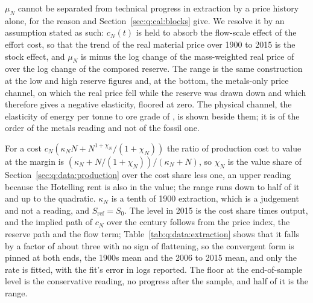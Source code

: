  $\mu_N$ cannot be separated from technical progress in extraction by a price history alone, for the reason  and Section~\ref{sec:q:cal:blocks} give. We resolve it by an assumption stated as such: $c_N\left(t\right)$ is held to absorb the flow-scale effect of the effort cost, so that the trend of the real material price over 1900 to 2015 is the stock effect, and $\mu_N$ is minus the log change of the mass-weighted real price of \textcite{jacks2019} over the log change of the composed reserve. The range is the same construction at the low and high reserve figures and, at the bottom, the metals-only price channel, on which the real price fell while the reserve was drawn down and which therefore gives a negative elasticity, floored at zero. The physical channel, the elasticity of energy per tonne to ore grade of \textcite{mudd2010}, is shown beside them; it is of the order of the metals reading and not of the fossil one.

 For a cost $c_N\left(\kappa_NN+N^{1+\chi_N}/\left(1+\chi_N\right)\right)$ the ratio of production cost to value at the margin is $\left(\kappa_N+N/\left(1+\chi_N\right)\right)/\left(\kappa_N+N\right)$, so $\chi_N$ is the value share of Section~\ref{sec:q:data:production} over the cost share less one, an upper reading because the Hotelling rent is also in the value; the range runs down to half of it and up to the quadratic. $\kappa_N$ is a tenth of 1900 extraction, which is a judgement and not a reading, and $S_{\mathrm{ref}}=S_0$. The level in 2015 is the cost share times output, and the implied path of $c_N$ over the century follows from the price index, the reserve path and the flow term; Table~\ref{tab:q:data:extraction} shows that it falls by a factor of about three with no sign of flattening, so the convergent form is pinned at both ends, the 1900s mean and the 2006 to 2015 mean, and only the rate is fitted, with the fit's error in logs reported. The floor at the end-of-sample level is the conservative reading, no progress after the sample, and half of it is the range.

